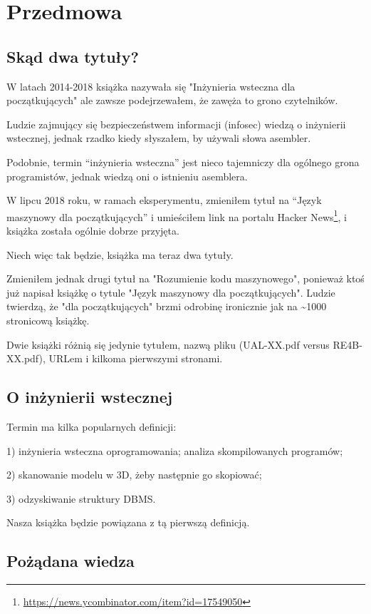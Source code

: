 \section*{Przedmowa}

\subsection*{Skąd dwa tytuły?}
\label{TwoTitles}

W latach 2014-2018 książka nazywała się "Inżynieria wsteczna dla początkujących" ale zawsze podejrzewałem, że zawęża to grono czytelników.

Ludzie zajmujący się bezpieczeństwem informacji (infosec) wiedzą o inżynierii wstecznej, jednak rzadko kiedy słyszałem, by używali słowa asembler.

Podobnie, termin ``inżynieria wsteczna'' jest nieco tajemniczy dla ogólnego grona programistów, jednak wiedzą oni o istnieniu asemblera.

W lipcu 2018 roku, w ramach eksperymentu, zmieniłem tytuł na ``Język maszynowy dla początkujących''
i umieściłem link na portalu Hacker News\footnote{\url{https://news.ycombinator.com/item?id=17549050}}, i książka została ogólnie dobrze przyjęta.

Niech więc tak będzie, książka ma teraz dwa tytuły.

Zmieniłem jednak drugi tytuł na "Rozumienie kodu maszynowego",
ponieważ ktoś już napisał książkę o tytule "Język maszynowy dla początkujących".
Ludzie twierdzą, że "dla początkujących" brzmi odrobinę ironicznie jak na \textasciitilde{}1000 stronicową książkę.

Dwie książki różnią się jedynie tytułem, nazwą pliku (UAL-XX.pdf versus RE4B-XX.pdf),
URLem i kilkoma pierwszymi stronami.

\subsection*{O inżynierii wstecznej}

Termin  ma kilka popularnych definicji:

1) inżynieria wsteczna oprogramowania; analiza skompilowanych programów; 

2) skanowanie modelu w 3D, żeby następnie go skopiować;

3) odzyskiwanie struktury \ac{DBMS}.

Nasza książka będzie powiązana z tą pierwszą definicją.

\subsection*{Pożądana wiedza}

